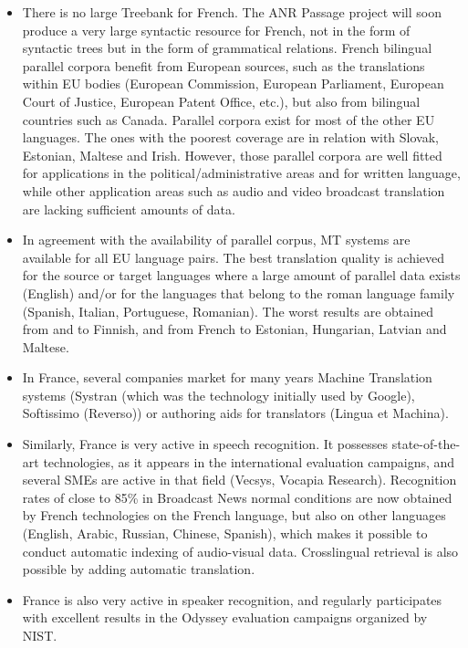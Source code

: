 \begin{multicols}{2}
\begin{itemize}
\item There is no large Treebank for French. The ANR Passage project will
soon produce a very large syntactic resource for French, not in the
form of syntactic trees but in the form of grammatical relations.
French bilingual parallel corpora benefit from European sources, such
as the translations within EU bodies (European Commission, European
Parliament, European Court of Justice, European Patent Office, etc.),
but also from bilingual countries such as Canada. Parallel corpora
exist for most of the other EU languages. The ones with the poorest
coverage are in relation with Slovak, Estonian, Maltese and
Irish. However, those parallel corpora are well fitted for
applications in the political/administrative areas and for written
language, while other application areas such as audio and video
broadcast translation are lacking sufficient amounts of data.

\item In agreement with the availability of parallel corpus, MT systems are
available for all EU language pairs. The best translation quality is
achieved for the source or target languages where a large amount of
parallel data exists (English) and/or for the languages that belong to
the roman language family (Spanish, Italian, Portuguese,
Romanian). The worst results are obtained from and to Finnish, and
from French to Estonian, Hungarian, Latvian and Maltese.

\item In France, several companies market for many years Machine Translation
systems (Systran (which was the technology initially used by Google),
Softissimo (Reverso)) or authoring aids for translators (Lingua et
Machina).

\item Similarly, France is very active in speech recognition. It possesses
state-of-the-art technologies, as it appears in the international
evaluation campaigns, and several SMEs are active in that field
(Vecsys, Vocapia Research). Recognition rates of close to 85\% in
Broadcast News normal conditions are now obtained by French
technologies on the French language, but also on other languages
(English, Arabic, Russian, Chinese, Spanish), which makes it possible
to conduct automatic indexing of audio-visual data. Crosslingual
retrieval is also possible by adding automatic translation.

\item France is also very active in speaker recognition, and regularly
participates with excellent results in the Odyssey evaluation
campaigns organized by NIST.


\end{itemize}
\end{multicols}
